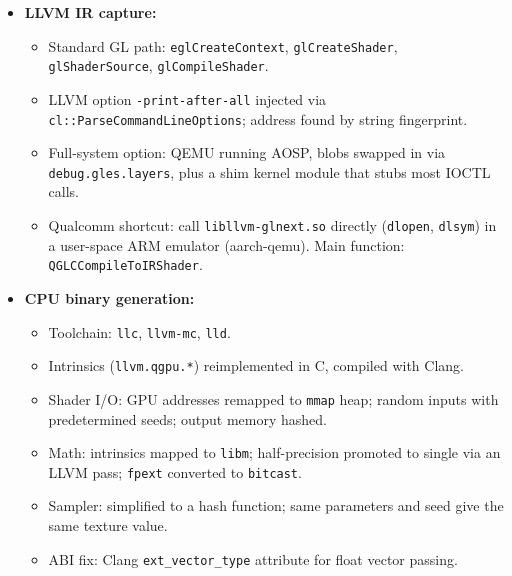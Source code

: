 \documentclass[11pt,a4paper]{article}
\begin{document}
\begin{enumerate}
\begin{itemize}[leftmargin=*, itemsep=1pt, topsep=2pt]
\begin{itemize}[itemsep=0pt]
\begin{itemize}[itemsep=0pt]
                \item Statement mutation (e.g., \texttt{mix(origin, unused, c)} with $c=1$).
                \item Control flow mutation (\texttt{if}$\leftrightarrow$\texttt{switch}, \texttt{for}$\leftrightarrow$\texttt{while}, loop wrap, unroll, split).
                \item Code donation (donated code with renamed variables, results stored to unused outputs).
            \end{itemize}
            \item \textbf{LLVM IR capture:}
            \begin{itemize}[itemsep=0pt]
                \item Standard GL path: \texttt{eglCreateContext}, \texttt{glCreateShader}, \texttt{glShaderSource}, \texttt{glCompileShader}.
                \item LLVM option \texttt{-print-after-all} injected via \texttt{cl::ParseCommandLineOptions}; address found by string fingerprint.
                \item Full-system option: QEMU running AOSP, blobs swapped in via \texttt{debug.gles.layers}, plus a shim kernel module that stubs most IOCTL calls.
                \item Qualcomm shortcut: call \texttt{libllvm-glnext.so} directly (\texttt{dlopen}, \texttt{dlsym}) in a user-space ARM emulator (aarch-qemu). Main function: \texttt{QGLCCompileToIRShader}.
            \end{itemize}
            \item \textbf{CPU binary generation:}
            \begin{itemize}[itemsep=0pt]
                \item Toolchain: \texttt{llc}, \texttt{llvm-mc}, \texttt{lld}.
                \item Intrinsics (\texttt{llvm.qgpu.*}) reimplemented in C, compiled with Clang.
                \item Shader I/O: GPU addresses remapped to \texttt{mmap} heap; random inputs with predetermined seeds; output memory hashed.
                \item Math: intrinsics mapped to \texttt{libm}; half-precision promoted to single via an LLVM pass; \texttt{fpext} converted to \texttt{bitcast}.
                \item Sampler: simplified to a hash function; same parameters and seed give the same texture value.
                \item ABI fix: Clang \texttt{ext\_vector\_type} attribute for float vector passing.

\end{itemize}
\end{itemize}
\end{itemize}
\end{enumerate}
\end{document}
